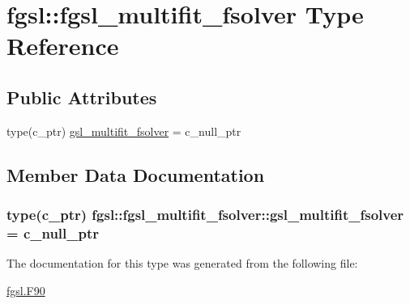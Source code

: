 \hypertarget{structfgsl_1_1fgsl__multifit__fsolver}{}\section{fgsl\+:\+:fgsl\+\_\+multifit\+\_\+fsolver Type Reference}
\label{structfgsl_1_1fgsl__multifit__fsolver}
\subsection*{Public Attributes}
\begin{DoxyCompactItemize}
\item 
type(c\+\_\+ptr) \hyperlink{structfgsl_1_1fgsl__multifit__fsolver_a4b7f26c5f38dd0b891c32f84d077ac37}{gsl\+\_\+multifit\+\_\+fsolver} = c\+\_\+null\+\_\+ptr
\end{DoxyCompactItemize}


\subsection{Member Data Documentation}
\hypertarget{structfgsl_1_1fgsl__multifit__fsolver_a4b7f26c5f38dd0b891c32f84d077ac37}{}
\subsubsection[{gsl\+\_\+multifit\+\_\+fsolver}]{\setlength{\rightskip}{0pt plus 5cm}type(c\+\_\+ptr) fgsl\+::fgsl\+\_\+multifit\+\_\+fsolver\+::gsl\+\_\+multifit\+\_\+fsolver = c\+\_\+null\+\_\+ptr}\label{structfgsl_1_1fgsl__multifit__fsolver_a4b7f26c5f38dd0b891c32f84d077ac37}


The documentation for this type was generated from the following file\+:\begin{DoxyCompactItemize}
\item 
\hyperlink{fgsl_8F90}{fgsl.\+F90}\end{DoxyCompactItemize}
